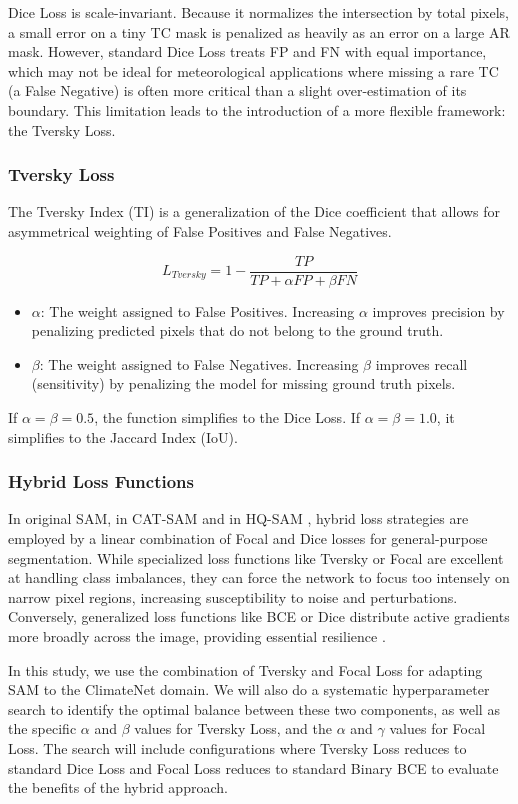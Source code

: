 Dice Loss is scale-invariant. Because it normalizes the intersection by total pixels, a small error on a tiny TC mask is penalized as heavily as an error on a large AR mask. However, standard Dice Loss treats FP and FN with equal importance, which may not be ideal for meteorological applications where missing a rare TC (a False Negative) is often more critical than a slight over-estimation of its boundary. This limitation leads to the introduction of a more flexible framework: the Tversky Loss.

\subsubsection{Tversky Loss}
The Tversky Index (TI) is a generalization of the Dice coefficient that allows for asymmetrical weighting of False Positives and False Negatives.

\begin{equation}
L_{Tversky} = 1 - \frac{TP}{TP + \alpha FP + \beta FN}
\end{equation}

\begin{itemize}
    \item $\alpha$: The weight assigned to False Positives. Increasing $\alpha$ improves precision by penalizing predicted pixels that do not belong to the ground truth.
    \item $\beta$: The weight assigned to False Negatives. Increasing $\beta$ improves recall (sensitivity) by penalizing the model for missing ground truth pixels.
\end{itemize}
If $\alpha = \beta = 0.5$, the function simplifies to the Dice Loss. If $\alpha = \beta = 1.0$, it simplifies to the Jaccard Index (IoU).

\subsubsection{Hybrid Loss Functions}
In original SAM, in CAT-SAM \cite{xiao2024cat} and in HQ-SAM \cite{ke2023segment}, hybrid loss strategies are employed by a linear combination of Focal and Dice losses for general-purpose segmentation. While specialized loss functions like Tversky or Focal are excellent at handling class imbalances, they can force the network to focus too intensely on narrow pixel regions, increasing susceptibility to noise and perturbations. Conversely, generalized loss functions like BCE or Dice distribute active gradients more broadly across the image, providing essential resilience \cite{rajput2021robustness}.

In this study, we use the combination of Tversky and Focal Loss for adapting SAM to the ClimateNet domain. We will also do a systematic hyperparameter search to identify the optimal balance between these two components, as well as the specific $\alpha$ and $\beta$ values for Tversky Loss, and the $\alpha$ and $\gamma$ values for Focal Loss. The search will include configurations where Tversky Loss reduces to standard Dice Loss and Focal Loss reduces to standard Binary BCE to evaluate the benefits of the hybrid approach.

